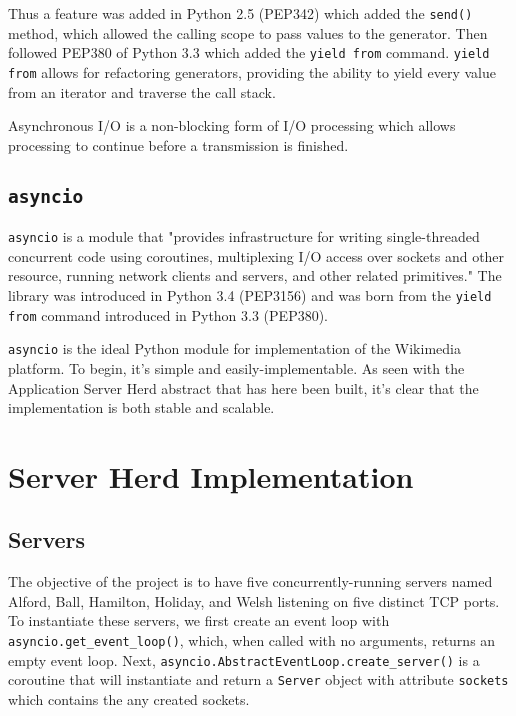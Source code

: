 \documentclass[letterpaper,twocolumn,10pt]{article}
\begin{document}
Thus a feature was added in Python 2.5 (PEP342) which added the \texttt{send()} method, which allowed the calling scope to pass values to the generator. Then followed PEP380 of Python 3.3 which added the \texttt{yield from} command. \texttt{yield from} allows for refactoring generators, providing the ability to yield every value from an iterator and traverse the call stack. 

Asynchronous I/O is a non-blocking form of I/O processing which allows processing to continue before a transmission is finished. 

\subsection{\texttt{asyncio}}

\texttt{asyncio} is a module that "provides infrastructure for writing single-threaded concurrent code using coroutines, multiplexing I/O access over sockets and other resource, running network clients and servers, and other related primitives." The library was introduced in Python 3.4 (PEP3156) and was born from the \texttt{yield from} command introduced in Python 3.3 (PEP380).


\texttt{asyncio} is the ideal Python module for implementation of the Wikimedia platform. To begin, it's simple and easily-implementable. As seen with the Application Server Herd abstract that has here been built, it's clear that the implementation is both stable and scalable. 


\section{Server Herd Implementation}


\subsection{Servers}

The objective of the project is to have five concurrently-running servers named Alford, Ball, Hamilton, Holiday, and Welsh listening on five distinct TCP ports. To instantiate these servers, we first create an event loop with \texttt{asyncio.get\_event\_loop()}, which, when called with no arguments, returns an empty event loop. Next, \texttt{asyncio.AbstractEventLoop.create\_server()} is a coroutine that will instantiate and return a \texttt{Server} object with attribute \texttt{sockets} which contains the any created sockets. 
\end{document}
